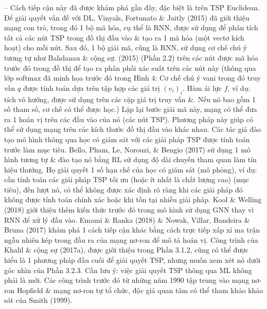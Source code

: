 \documentclass{article}
\begin{document}
\begin{itemize}
\begin{itemize}
\begin{itemize}
            -- Cách tiếp cận này đã được khám phá gần đây, đặc biệt là trên TSP Euclidean. Để giải quyết vấn đề với DL, Vinyals, Fortunato \& Jaitly (2015) đã giới thiệu mạng con trỏ, trong đó 1 bộ mã hóa, cụ thể là RNN, được sử dụng để phân tích tất cả các nút TSP trong đồ thị đầu vào \& tạo ra 1 mã hóa (một vectơ kích hoạt) cho mỗi nút. Sau đó, 1 bộ giải mã, cũng là RNN, sử dụng cơ chế chú ý tương tự như Bahdanau \& cộng sự. (2015) (Phần 2.2) trên các nút được mã hóa trước đó trong đồ thị để tạo ra phân phối xác suất trên các nút này (thông qua lớp softmax đã minh họa trước đó trong {\sf Hình 4: Cơ chế chú ý vani trong đó truy vấn $q$ được tính toán dựa trên tập hợp các giá trị $(v_i)_i$. Hàm ái lực $f$, ví dụ: tích vô hướng, được sử dụng trên các cặp giá trị truy vấn \&. Nếu nó bao gồm 1 số tham số, cơ chế có thể được học.}) Lặp lại bước giải mã này, mạng có thể đưa ra 1 hoán vị trên các đầu vào của nó (các nút TSP). Phương pháp này giúp có thể sử dụng mạng trên các kích thước đồ thị đầu vào khác nhau. Các tác giả đào tạo mô hình thông qua học có giám sát với các giải pháp TSP được tính toán trước làm mục tiêu. Bello, Pham, Le, Norouzi, \& Bengio (2017) sử dụng 1 mô hình tương tự \& đào tạo nó bằng RL sử dụng độ dài chuyến tham quan làm tín hiệu thưởng. Họ giải quyết 1 số hạn chế của học có giám sát (mô phỏng), ví dụ: cần tính toán các giải pháp TSP tối ưu (hoặc ít nhất là chất lượng cao) (mục tiêu), đến lượt nó, có thể không được xác định rõ ràng khi các giải pháp đó không được tính toán chính xác hoặc khi tồn tại nhiều giải pháp. Kool \& Welling (2018) giới thiệu thêm kiến thức trước đó trong mô hình sử dụng GNN thay vì RNN để xử lý đầu vào. Emami \& Ranka (2018) \& Nowak, Villar, Bandeira \& Bruna (2017) khám phá 1 cách tiếp cận khác bằng cách trực tiếp xấp xỉ ma trận ngẫu nhiên kép trong đầu ra của mạng nơ-ron để mô tả hoán vị. Công trình của Khalil \& cộng sự (2017a), được giới thiệu trong Phần 3.1.2, cũng có thể được hiểu là 1 phương pháp đầu cuối để giải quyết TSP, nhưng muốn xem xét nó dưới góc nhìn của Phần 3.2.3. Cần lưu ý: việc giải quyết TSP thông qua ML không phải là mới. Các công trình trước đó từ những năm 1990 tập trung vào mạng nơ-ron Hopfield \& mạng nơ-ron tự tổ chức, độc giả quan tâm có thể tham khảo khảo sát của Smith (1999).


\end{itemize}
\end{itemize}
\end{itemize}
\end{document}
